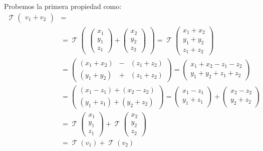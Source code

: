\documentclass[12pt]{report}                                    %
\DeclareMathOperator \LinealTransformation {\mathcal{T}}        %
\DeclareMathOperator \LT {\mathcal{T}}                          %
\newcommand{\pVector}[1]{                                       %
        \ensuremath{\begin{pmatrix}#1\end{pmatrix}}                 %
    }
\begin{document}
            Probemos la primera propiedad como:
            \begin{equation*}
            \begin{split}
                \LinealTransformation \pVector{ v_1 + v_2 }                                             & = \\
                &= \LinealTransformation \pVector{ \pVector{x_1\\y_1\\z_1} +\pVector{x_2\\y_2\\z_2} }
                 = \LinealTransformation \pVector{ x_1+x_2\\y_1+y_2\\z_1+z_2 }                              \\
                &= \pVector{ (x_1+x_2) & - & (z_1+z_2) \\ (y_1+y_2) & + & (z_1+z_2) }                       
                 = \pVector{ x_1+x_2-z_1-z_2 \\ y_1+y_2+z_1+z_2 }                                           \\
                &= \pVector{ (x_1-z_1)+(x_2-z_2) \\ (y_1+z_1)+(y_2+z_2) }                                   
                 = \pVector{ x_1-z_1\\y_1+z_1 }  + \pVector{ x_2-z_2\\y_2+z_2 }                             \\
                &= \LT \pVector{x_1\\y_1\\z_1} +\LT \pVector{x_2\\y_2\\z_2}                                 \\
                &= \LinealTransformation(v_1) + \LinealTransformation(v_2)
            \end{split}
            \end{equation*}
\end{document}
